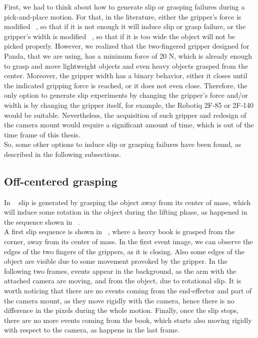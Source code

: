 First, we had to think about how to generate slip or grasping failures during a pick-and-place motion. For that, in the literature, either the gripper's force is modified ~\cite{gelsight2017}, so that if it is not enough it will induce slip or grasp failure, or the gripper's width is modified ~\cite{gelsight2018}, so that if it is too wide the object will not be picked properly. However, we realized that the two-fingered gripper designed for Panda, that we are using, has a minimum force of 20 N, which is already enough to grasp and move lightweight objects and even heavy objects grasped from the center. Moreover, the gripper width has a binary behavior, either it closes until the indicated gripping force is reached, or it does not even close. Therefore, the only option to generate slip experiments by changing the gripper's force and/or width is by changing the gripper itself, for example, the Robotiq 2F-85 or 2F-140 would be suitable. Nevertheless, the acquisition of such gripper and redesign of the camera mount would require a significant amount of time, which is out of the time frame of this thesis.\\

So, some other options to induce slip or grasping failures have been found, as described in the following subsections.

\subsection{Off-centered grasping}

In ~\cite{rss2020} slip is generated by grasping the object away from its center of mass, which will induce some rotation in the object during the lifting phase, as happened in the sequence shown in ~.\\

A first slip sequence is shown in ~, where a heavy book is grasped from the corner, away from its center of mass. In the first event image, we can observe the edges of the two fingers of the grippers, as it is closing. Also some edges of the object are visible due to some movement provoked by the gripper. In the following two frames, events appear in the background, as the arm with the attached camera are moving, and from the object, due to rotational slip. It is worth noticing that there are no events coming from the end-effector and part of the camera mount, as they move rigidly with the camera, hence there is no difference in the pixels during the whole motion. Finally, once the slip stops, there are no more events coming from the book, which starts also moving rigidly with respect to the camera, as happens in the last frame.


